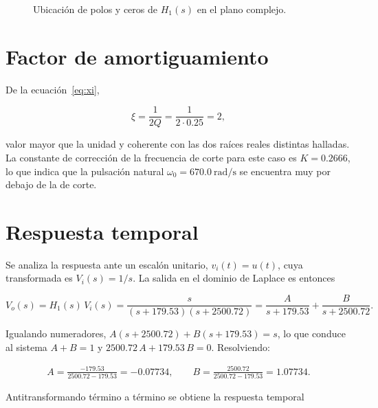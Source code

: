 \begin{figure}[!ht]
  \centering
  
  \caption{Ubicación de polos y ceros de $H_1(s)$ en el plano complejo.}
  \label{fig:polos-q025}
\end{figure}

\section{Factor de amortiguamiento}

De la ecuación~\eqref{eq:xi},

\begin{equation}
  \xi = \frac{1}{2Q} = \frac{1}{2 \cdot \num{0.25}} = 2,
  \label{eq:xi-q025}
\end{equation}

valor mayor que la unidad y coherente con las dos raíces reales distintas halladas. La constante de
corrección de la frecuencia de corte para este caso es $K = \num{0.2666}$, lo que indica que la pulsación
natural $\omega_0 = \qty{670.0}{\radian\per\second}$ se encuentra muy por debajo de la de corte.

\section{Respuesta temporal}

Se analiza la respuesta ante un escalón unitario, $v_i(t) = u(t)$, cuya transformada es
$V_i(s) = 1/s$. La salida en el dominio de Laplace es entonces

\begin{equation}
  V_o(s) = H_1(s)\, V_i(s)
         = \frac{s}{\left(s + \num{179.53}\right)\left(s + \num{2500.72}\right)}
         = \frac{A}{s + \num{179.53}} + \frac{B}{s + \num{2500.72}}.
  \label{eq:vo-q025}
\end{equation}

Igualando numeradores, $A\left(s + \num{2500.72}\right) + B\left(s + \num{179.53}\right) = s$, lo que
conduce al sistema $A + B = 1$ y $\num{2500.72}\,A + \num{179.53}\,B = 0$. Resolviendo:

\begin{gather*}
  A = \frac{\num{-179.53}}{\num{2500.72} - \num{179.53}} = \num{-0.07734}, \qquad
  B = \frac{\num{2500.72}}{\num{2500.72} - \num{179.53}} = \num{1.07734}.
\end{gather*}

Antitransformando término a término se obtiene la respuesta temporal

